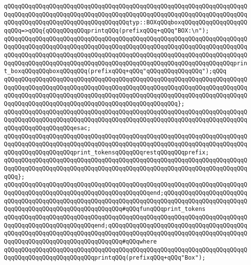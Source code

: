 \newline
\verb|qQQqqQQqqQQqqQQqqQQqqQQqqQQqqQQqqQQqqQQqqQQqqQQqqQQqqQQqqQQqqQQqqQQqqQQqqQQqqQQqqQQqqQQqqQQqqQQqqQQqqQQqqQQqqQQqqQQqqQQqqQQqqQQqqQQqqQQqqQQqqQQqqQQqqQQqqQQqqQQqqQQqqQQqqQQqqQQqtyp::BOXqQQqboxqQQqqQQqqQQqqQQqqQQqqQQq=>qQQq{qQQqqQQqqQQqprintqQQq(prefixqQQq+qQQq"BOX:\n");|\newline
\verb|qQQqqQQqqQQqqQQqqQQqqQQqqQQqqQQqqQQqqQQqqQQqqQQqqQQqqQQqqQQqqQQqqQQqqQQqqQQqqQQqqQQqqQQqqQQqqQQqqQQqqQQqqQQqqQQqqQQqqQQqqQQqqQQqqQQqqQQqqQQqqQQqqQQqqQQqqQQqqQQqqQQqqQQqqQQqqQQqqQQqqQQqqQQqqQQqqQQqqQQqqQQqqQQqqQQqqQQqqQQqqQQqqQQqqQQqqQQqqQQqqQQqqQQqqQQqqQQqqQQqqQQqqQQqqQQqqQQqprint_boxqQQqqQQqboxqQQqqQQq(prefixqQQq+qQQq"qQQqqQQqqQQqqQQq");qQQq|\newline
\verb|qQQqqQQqqQQqqQQqqQQqqQQqqQQqqQQqqQQqqQQqqQQqqQQqqQQqqQQqqQQqqQQqqQQqqQQqqQQqqQQqqQQqqQQqqQQqqQQqqQQqqQQqqQQqqQQqqQQqqQQqqQQqqQQqqQQqqQQqqQQqqQQqqQQqqQQqqQQqqQQqqQQqqQQqqQQqqQQqqQQqqQQqqQQqqQQqqQQqqQQqqQQqqQQqqQQqqQQqqQQqqQQqqQQqqQQqqQQqqQQqqQQqqQQqqQQqqQQqqQQq};|\newline
\verb|qQQqqQQqqQQqqQQqqQQqqQQqqQQqqQQqqQQqqQQqqQQqqQQqqQQqqQQqqQQqqQQqqQQqqQQqqQQqqQQqqQQqqQQqqQQqqQQqqQQqqQQqqQQqqQQqqQQqqQQqqQQqqQQqqQQqqQQqqQQqqQQqqQQqqQQqqQQqqQQqesac;|\newline
\newline
\verb|qQQqqQQqqQQqqQQqqQQqqQQqqQQqqQQqqQQqqQQqqQQqqQQqqQQqqQQqqQQqqQQqqQQqqQQqqQQqqQQqqQQqqQQqqQQqqQQqqQQqqQQqqQQqqQQqqQQqqQQqqQQqqQQqqQQqqQQqqQQqqQQqqQQqqQQqqQQqqQQqprint_tokensqQQqqQQqrestqQQqqQQqprefix;|\newline
\verb|qQQqqQQqqQQqqQQqqQQqqQQqqQQqqQQqqQQqqQQqqQQqqQQqqQQqqQQqqQQqqQQqqQQqqQQqqQQqqQQqqQQqqQQqqQQqqQQqqQQqqQQqqQQqqQQqqQQqqQQqqQQqqQQqqQQqqQQqqQQqqQQq};|\newline
\verb|qQQqqQQqqQQqqQQqqQQqqQQqqQQqqQQqqQQqqQQqqQQqqQQqqQQqqQQqqQQqqQQqqQQqqQQqqQQqqQQqqQQqqQQqqQQqqQQqqQQqqQQqqQQqqQQqend;qQQqqQQqqQQqqQQqqQQqqQQqqQQqqQQqqQQqqQQqqQQqqQQqqQQqqQQqqQQqqQQqqQQqqQQqqQQqqQQqqQQqqQQqqQQqqQQqqQQqqQQqqQQqqQQqqQQqqQQqqQQqqQQq#qQQqfunqQQqprint_tokens|\newline
\verb|qQQqqQQqqQQqqQQqqQQqqQQqqQQqqQQqqQQqqQQqqQQqqQQqqQQqqQQqqQQqqQQqqQQqqQQqqQQqqQQqqQQqqQQqqQQqqQQqend;qQQqqQQqqQQqqQQqqQQqqQQqqQQqqQQqqQQqqQQqqQQqqQQqqQQqqQQqqQQqqQQqqQQqqQQqqQQqqQQqqQQqqQQqqQQqqQQqqQQqqQQqqQQqqQQqqQQqqQQqqQQqqQQqqQQqqQQqqQQqqQQq#qQQqwhere|\newline
\verb|qQQqqQQqqQQqqQQqqQQqqQQqqQQqqQQqqQQqqQQqqQQqqQQqqQQqqQQqqQQqqQQqqQQqqQQqqQQqqQQqqQQqqQQqqQQqqQQqprintqQQq(prefixqQQq+qQQq"Box");|\newline
